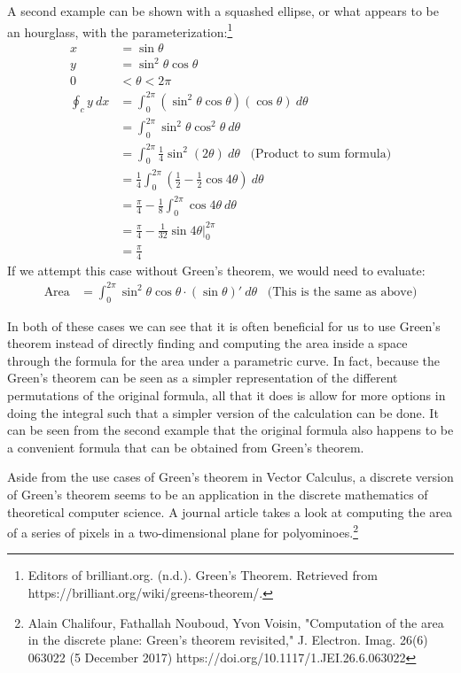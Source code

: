 \documentclass[11pt,English]{article}
\begin{document}
A second example can be shown with a squashed ellipse, or what appears to be an hourglass, with the parameterization:\footnote{Editors of brilliant.org. (n.d.). Green's Theorem. Retrieved from https://brilliant.org/wiki/greens-theorem/.}
\begin{align*}
    x &= \sin{\theta} \\
    y &= \sin^2{\theta}\cos{\theta} \\
    0 &< \theta < 2\pi \\
    \oint_{c}y\:dx &= \int^{2\pi}_{0}(\sin^2{\theta}\cos{\theta})(\cos{\theta})\:d\theta \\
    &= \int^{2\pi}_{0} \sin^2{\theta}\cos^2{\theta}\:d\theta \\
    &= \int^{2\pi}_{0} \frac{1}{4}\sin^2(2\theta)\:d\theta \;\;\; \text{(Product to sum formula)} \\
    &= \frac{1}{4}\int^{2\pi}_{0}(\frac{1}{2}-\frac{1}{2}\cos{4\theta})\:d\theta \\
    &= \frac{\pi}{4} - \frac{1}{8}\int^{2\pi}_{0}\cos{4\theta}\:d\theta \\
    &= \frac{\pi}{4}-\frac{1}{32}\sin{4\theta}\Big|^{2\pi}_{0} \\
    &= \frac{\pi}{4}
\end{align*}
If we attempt this case without Green's theorem, we would need to evaluate:
\begin{align*}
\text{Area} &= \int^{2\pi}_{0} \sin^2{\theta}\cos{\theta}\cdot (\sin{\theta})'\:d\theta\;\;\; \text{(This is the same as above)}
\end{align*}

In both of these cases we can see that it is often beneficial for us to use Green's theorem instead of directly finding and computing the area inside a space through the formula for the area under a parametric curve. In fact, because the Green's theorem can be seen as a simpler representation of the different permutations of the original formula, all that it does is allow for more options in doing the integral such that a simpler version of the calculation can be done. It can be seen from the second example that the original formula also happens to be a convenient formula that can be obtained from Green's theorem.

Aside from the use cases of Green's theorem in Vector Calculus, a discrete version of Green's theorem seems to be an application in the discrete mathematics of theoretical computer science. A journal article takes a look at computing the area of a series of pixels in a two-dimensional plane for polyominoes.\footnote{Alain Chalifour, Fathallah Nouboud, Yvon Voisin, "Computation of the area in the discrete plane: Green’s theorem revisited," J. Electron. Imag. 26(6) 063022 (5 December 2017) https://doi.org/10.1117/1.JEI.26.6.063022}
\end{document}
